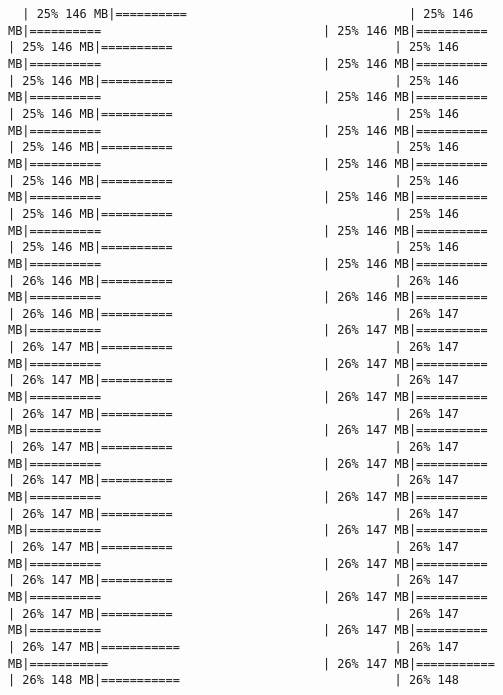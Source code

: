 \documentclass[
]{article}
\begin{document}
\begin{verbatim}
  | 25% 146 MB|==========                               | 25% 146 MB|==========                               | 25% 146 MB|==========                               | 25% 146 MB|==========                               | 25% 146 MB|==========                               | 25% 146 MB|==========                               | 25% 146 MB|==========                               | 25% 146 MB|==========                               | 25% 146 MB|==========                               | 25% 146 MB|==========                               | 25% 146 MB|==========                               | 25% 146 MB|==========                               | 25% 146 MB|==========                               | 25% 146 MB|==========                               | 25% 146 MB|==========                               | 25% 146 MB|==========                               | 25% 146 MB|==========                               | 25% 146 MB|==========                               | 25% 146 MB|==========                               | 25% 146 MB|==========                               | 25% 146 MB|==========                               | 25% 146 MB|==========                               | 25% 146 MB|==========                               | 25% 146 MB|==========                               | 26% 146 MB|==========                               | 26% 146 MB|==========                               | 26% 146 MB|==========                               | 26% 146 MB|==========                               | 26% 147 MB|==========                               | 26% 147 MB|==========                               | 26% 147 MB|==========                               | 26% 147 MB|==========                               | 26% 147 MB|==========                               | 26% 147 MB|==========                               | 26% 147 MB|==========                               | 26% 147 MB|==========                               | 26% 147 MB|==========                               | 26% 147 MB|==========                               | 26% 147 MB|==========                               | 26% 147 MB|==========                               | 26% 147 MB|==========                               | 26% 147 MB|==========                               | 26% 147 MB|==========                               | 26% 147 MB|==========                               | 26% 147 MB|==========                               | 26% 147 MB|==========                               | 26% 147 MB|==========                               | 26% 147 MB|==========                               | 26% 147 MB|==========                               | 26% 147 MB|==========                               | 26% 147 MB|==========                               | 26% 147 MB|==========                               | 26% 147 MB|==========                               | 26% 147 MB|==========                               | 26% 147 MB|==========                               | 26% 147 MB|==========                               | 26% 147 MB|==========                               | 26% 147 MB|===========                              | 26% 147 MB|===========                              | 26% 147 MB|===========                              | 26% 148 MB|===========                              | 26% 148 
\end{verbatim}
\end{document}
